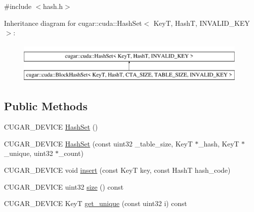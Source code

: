 {\ttfamily \#include $<$hash.\+h$>$}

Inheritance diagram for cugar\+:\+:cuda\+:\+:Hash\+Set$<$ KeyT, HashT, I\+N\+V\+A\+L\+I\+D\+\_\+\+K\+EY $>$\+:\begin{figure}[H]
\begin{center}
\leavevmode
\includegraphics[height=2.000000cm]{structcugar_1_1cuda_1_1_hash_set}
\end{center}
\end{figure}
\subsection*{Public Methods}
\begin{DoxyCompactItemize}
\item 
C\+U\+G\+A\+R\+\_\+\+D\+E\+V\+I\+CE \hyperlink{structcugar_1_1cuda_1_1_hash_set_adc0a880b09c96a8723b7caf1c9a266fa}{Hash\+Set} ()
\item 
C\+U\+G\+A\+R\+\_\+\+D\+E\+V\+I\+CE \hyperlink{structcugar_1_1cuda_1_1_hash_set_a1fe8c1c90b9be37242999e97714998e3}{Hash\+Set} (const uint32 \+\_\+table\+\_\+size, KeyT $\ast$\+\_\+hash, KeyT $\ast$\+\_\+unique, uint32 $\ast$\+\_\+count)
\item 
C\+U\+G\+A\+R\+\_\+\+D\+E\+V\+I\+CE void \hyperlink{structcugar_1_1cuda_1_1_hash_set_a417db996be279f2a91dc97390021c96f}{insert} (const KeyT key, const HashT hash\+\_\+code)
\item 
C\+U\+G\+A\+R\+\_\+\+D\+E\+V\+I\+CE uint32 \hyperlink{structcugar_1_1cuda_1_1_hash_set_a624a256797d939b735e4aee67c352693}{size} () const
\item 
C\+U\+G\+A\+R\+\_\+\+D\+E\+V\+I\+CE KeyT \hyperlink{structcugar_1_1cuda_1_1_hash_set_a50361944a81d2bf60e528de63313db32}{get\+\_\+unique} (const uint32 i) const
\end{DoxyCompactItemize}
